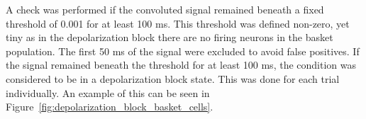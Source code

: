 \noindent A check was performed if the convoluted signal remained beneath a fixed
threshold of 0.001 for at least 100 ms. This threshold was defined non-zero,
yet tiny as in the depolarization block there are no firing neurons in the
basket population. The first 50 ms of the signal were excluded to avoid false
positives. If the signal remained beneath the threshold for at least 100 ms,
the condition was considered to be in a depolarization block state. This was
done for each trial individually. An example of this can be seen in Figure~\ref{fig:depolarization_block_basket_cells}.

